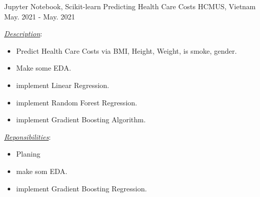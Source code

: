 

\begin{cventries}

  \cventry
    {Jupyter Notebook, Scikit-learn} %
    {Predicting Health Care Costs} %
    {HCMUS, Vietnam} %
    {May. 2021 - May. 2021} %
    {
      \begin{cvitems} %
        \item \underline{\textit{Description}}:
        \begin{itemize}
          \item Predict Health Care Costs via BMI, Height, Weight, is smoke, gender.
          \item Make some EDA.
          \item implement Linear Regression.
          \item implement Random Forest Regression.
          \item implement Gradient Boosting Algorithm.
        \end{itemize}
        \item \underline{\textit{Reponsibilities}}: 
        \begin{itemize}
          \item Planing
          \item make som EDA.
          \item implement Gradient Boosting Regression.
        \end{itemize}
      \end{cvitems}
    }


\end{cventries}

